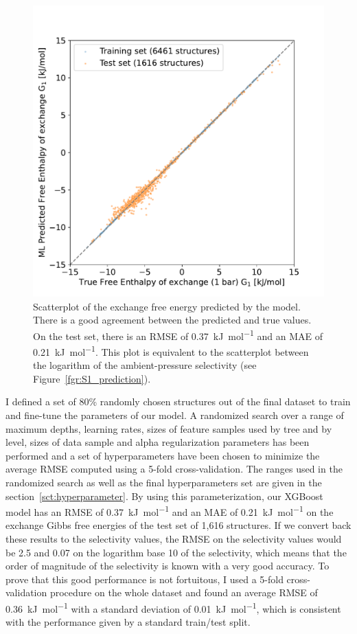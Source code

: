 \documentclass[main]{subfiles}
\begin{document}
\begin{figure}[ht]
\centering
  \includegraphics[width=0.5\linewidth]{figures/4-ml/main/Scatterplot_G1_prediction.pdf}
  \caption{Scatterplot of the exchange free energy predicted by the model. There is a good agreement between the predicted and true values. On the test set, there is an RMSE of \SI{0.37}{\kilo\joule\per\mole} and an MAE of \SI{0.21}{\kilo\joule\per\mole}. This plot is equivalent to the scatterplot between the logarithm of the ambient-pressure selectivity (see Figure~\ref{fgr:S1_prediction}).}\label{fgr:G1_prediction}
\end{figure}

I defined a set of {80\%} randomly chosen structures out of the final dataset to train and fine-tune the parameters of our model. A randomized search over a range of maximum depths, learning rates, sizes of feature samples used by tree and by level, sizes of data sample and alpha regularization parameters has been performed and a set of hyperparameters have been chosen to minimize the average RMSE computed using a 5-fold cross-validation. The ranges used in the randomized search as well as the final hyperparameters set are given in the section~\ref{sct:hyperparameter}. By using this parameterization, our XGBoost model has an RMSE of \SI{0.37}{\kilo\joule\per\mole} and an MAE of \SI{0.21}{\kilo\joule\per\mole} on the exchange Gibbs free energies of the test set of 1,616 structures. If we convert back these results to the selectivity values, the RMSE on the selectivity values would be 2.5 and 0.07 on the logarithm base 10 of the selectivity, which means that the order of magnitude of the selectivity is known with a very good accuracy. To prove that this good performance is not fortuitous, I used a 5-fold cross-validation procedure on the whole dataset and found an average RMSE of \SI{0.36}{\kilo\joule\per\mole} with a standard deviation of \SI{0.01}{\kilo\joule\per\mole}, which is consistent with the performance given by a standard train/test split.
\end{document}
